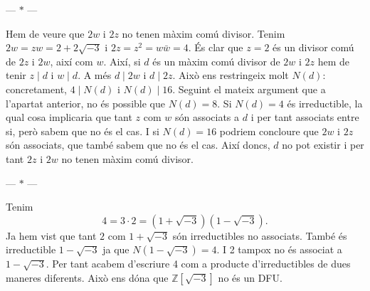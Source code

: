 \documentclass[12pt]{article}
\newcommand{\Z}{\mathbb{Z}}
\newcommand{\R}{\Z[\sqrt{-3}]}
\newcommand{\parbreak}{
	\begin{center}
		--- $\ast$ ---
	\end{center} 
}
\begin{document}
\parbreak

Hem de veure que \( 2w \) i \( 2z \) no tenen màxim comú divisor. Tenim \( 2w = zw = 2 + 2\sqrt{-3} \) i \( 2z = z^2 = w\bar{w} = 4 \). És clar que \( z = 2 \) és un divisor comú de \( 2z \) i \( 2w \), així com \( w \). Així, si \( d \) és un màxim comú divisor de \( 2w \) i \( 2z \) hem de tenir \( z \mid d \) i \( w \mid d \). A més \( d \mid 2w \) i \( d \mid 2z \). Això ens restringeix molt \( N(d) \): concretament, \( 4 \mid N(d) \) i \( N(d) \mid 16 \). Seguint el mateix argument que a l'apartat anterior, no és possible que \( N(d) = 8 \). Si \( N(d) = 4 \) és irreductible, la qual cosa implicaria que tant \( z \) com \( w \) són associats a \( d \) i per tant associats entre si, però sabem que no és el cas. I si \( N(d) = 16 \) podriem concloure que \( 2w \) i \( 2z \) són associats, que també sabem que no és el cas. Així doncs, \( d \) no pot existir i per tant \( 2z \) i \( 2w \) no tenen màxim comú divisor.   



\parbreak

Tenim 
\begin{equation*}
	4 = 3 \cdot 2 = (1 + \sqrt{-3})(1 - \sqrt{-3}).
\end{equation*}
Ja hem vist que tant \( 2 \) com \( 1 + \sqrt{-3} \) són irreductibles no associats. També és irreductible \( 1 - \sqrt{-3} \) ja que \( N(1 - \sqrt{-3}) = 4 \). I 2 tampox no és associat a \( 1 - \sqrt{-3} \). Per tant acabem d'escriure 4 com a producte d'irreductibles de dues maneres diferents. Això ens dóna que \( \R \) no és un DFU.    
\end{document}
